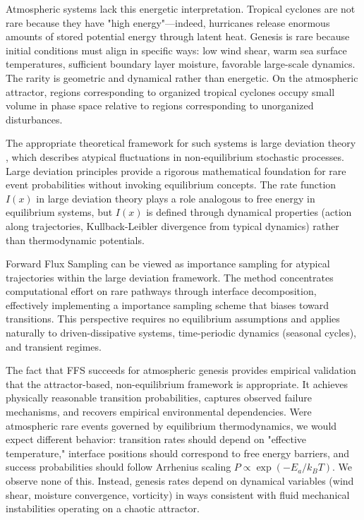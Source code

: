 \documentclass[11pt]{article}
\begin{document}
Atmospheric systems lack this energetic interpretation. Tropical cyclones are not rare because they have "high energy"—indeed, hurricanes release enormous amounts of stored potential energy through latent heat. Genesis is rare because initial conditions must align in specific ways: low wind shear, warm sea surface temperatures, sufficient boundary layer moisture, favorable large-scale dynamics. The rarity is geometric and dynamical rather than energetic. On the atmospheric attractor, regions corresponding to organized tropical cyclones occupy small volume in phase space relative to regions corresponding to unorganized disturbances.

The appropriate theoretical framework for such systems is large deviation theory \citep{touchette2009large}, which describes atypical fluctuations in non-equilibrium stochastic processes. Large deviation principles provide a rigorous mathematical foundation for rare event probabilities without invoking equilibrium concepts. The rate function $I(x)$ in large deviation theory plays a role analogous to free energy in equilibrium systems, but $I(x)$ is defined through dynamical properties (action along trajectories, Kullback-Leibler divergence from typical dynamics) rather than thermodynamic potentials.

Forward Flux Sampling can be viewed as importance sampling for atypical trajectories within the large deviation framework. The method concentrates computational effort on rare pathways through interface decomposition, effectively implementing a importance sampling scheme that biases toward transitions. This perspective requires no equilibrium assumptions and applies naturally to driven-dissipative systems, time-periodic dynamics (seasonal cycles), and transient regimes.

The fact that FFS succeeds for atmospheric genesis provides empirical validation that the attractor-based, non-equilibrium framework is appropriate. It achieves physically reasonable transition probabilities, captures observed failure mechanisms, and recovers empirical environmental dependencies. Were atmospheric rare events governed by equilibrium thermodynamics, we would expect different behavior: transition rates should depend on "effective temperature," interface positions should correspond to free energy barriers, and success probabilities should follow Arrhenius scaling $P \propto \exp(-E_a/k_BT)$. We observe none of this. Instead, genesis rates depend on dynamical variables (wind shear, moisture convergence, vorticity) in ways consistent with fluid mechanical instabilities operating on a chaotic attractor.
\end{document}
